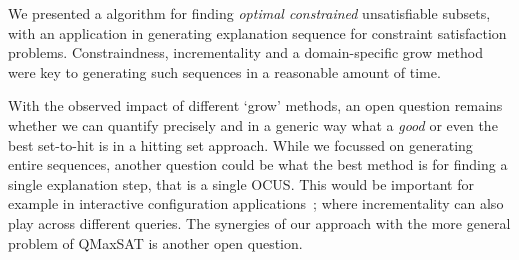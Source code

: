 We presented a \hitsetbased algorithm for finding \textit{optimal constrained} unsatisfiable subsets, with an application in generating explanation sequence for constraint satisfaction problems. Constraindness, incrementality and a domain-specific grow method were key to generating such sequences in a reasonable amount of time.




With the observed impact of different `grow' methods, an open question remains whether we can quantify precisely and in a generic way what a \textit{good} or even the best set-to-hit is in a hitting set approach. 
While we focussed on generating entire sequences, another question could be what the best method is for finding a single explanation step, that is a single OCUS. 
This would be important for example in interactive configuration applications~\cite{van2017kb}; where incrementality can also play across different queries.
The synergies of our approach with the more general problem of QMaxSAT \cite{DBLP:journals/constraints/IgnatievJM16} is another open question.


